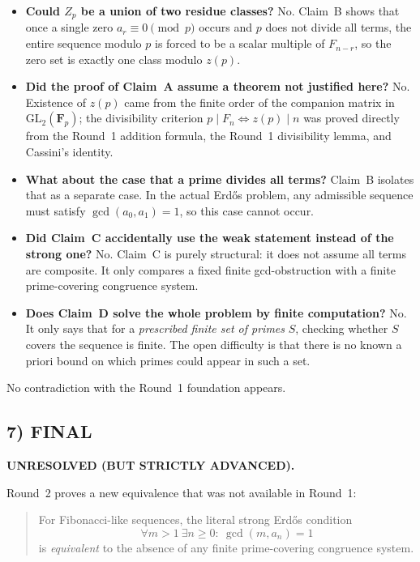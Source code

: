 \begin{itemize}
\item \textbf{Could $Z_p$ be a union of two residue classes?} No. Claim~B shows that once a single zero $a_r\equiv 0\pmod p$ occurs and $p$ does not divide all terms, the entire sequence modulo $p$ is forced to be a scalar multiple of $F_{n-r}$, so the zero set is exactly one class modulo $z(p)$.

\item \textbf{Did the proof of Claim~A assume a theorem not justified here?} No. Existence of $z(p)$ came from the finite order of the companion matrix in $\mathrm{GL}_2(\mathbf{F}_p)$; the divisibility criterion $p\mid F_n\iff z(p)\mid n$ was proved directly from the Round~1 addition formula, the Round~1 divisibility lemma, and Cassini's identity.

\item \textbf{What about the case that a prime divides all terms?} Claim~B isolates that as a separate case. In the actual Erd\H{o}s problem, any admissible sequence must satisfy $\gcd(a_0,a_1)=1$, so this case cannot occur.

\item \textbf{Did Claim~C accidentally use the weak statement instead of the strong one?} No. Claim~C is purely structural: it does not assume all terms are composite. It only compares a fixed finite gcd-obstruction with a finite prime-covering congruence system.

\item \textbf{Does Claim~D solve the whole problem by finite computation?} No. It only says that for a \emph{prescribed finite set of primes} $S$, checking whether $S$ covers the sequence is finite. The open difficulty is that there is no known a priori bound on which primes could appear in such a set.
\end{itemize}

No contradiction with the Round~1 foundation appears.

\subsection*{7) FINAL}
\textbf{UNRESOLVED (BUT STRICTLY ADVANCED).}

Round~2 proves a new equivalence that was not available in Round~1:

\begin{quote}
For Fibonacci-like sequences, the literal strong Erd\H{o}s condition
\[
\forall m>1\ \exists n\ge 0:\ \gcd(m,a_n)=1
\]
is \emph{equivalent} to the absence of any finite prime-covering congruence system.
\end{quote}

